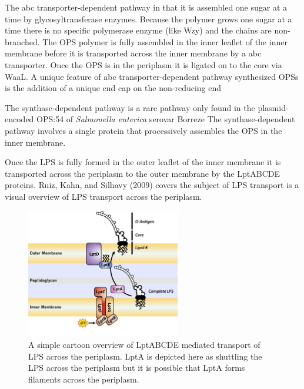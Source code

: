 The \ac{abc} transporter-dependent pathway in that it is assembled one sugar at a time by glycosyltransferase enzymes. Because the polymer grows one sugar at a time there is no
specific polymerase enzyme (like Wzy) and the chains are non-branched. The \ac{OPS} polymer is fully assembled in the inner leaflet of the inner membrane before it is transported
across the inner membrane by a \ac{abc} transporter. Once the \ac{OPS} is in the periplasm it is ligated on to the core via WaaL. A unique feature of \ac{abc} transporter-dependent
pathway synthesized \acp{OPS} is the addition of a unique end cap on the non-reducing end

The synthase-dependent pathway is a rare pathway only found in the plasmid-encoded \ac{OPS}:54 of \textit{Salmonella enterica} serovar Borreze The
synthase-dependent pathway involves a single protein that processively assembles the \ac{OPS} in the inner membrane.

Once the \ac{LPS} is fully formed in the outer leaflet of the inner membrane it is transported across the periplasm to the outer membrane by the LptABCDE proteins. Ruiz, Kahn, and
Silhavy (2009) covers the subject of \ac{LPS} transport  is a visual overview of \ac{LPS} transport across the periplasm.
 
\begin{figure}[htb]
  	\begin{center}
   		\includegraphics[width=0.6\textwidth]{intro/img/lpstransport.pdf}
   	\end{center}
   	\caption[A simple overview of \ac{LPS} transport across the periplasm]{ A simple cartoon overview of LptABCDE mediated transport of \ac{LPS} across the periplasm. LptA is
depicted here as shuttling the \ac{LPS} across the periplasm but it is possible that LptA forms filaments across the periplasm.}
\label{fig:lpstransport}
\end{figure} %
